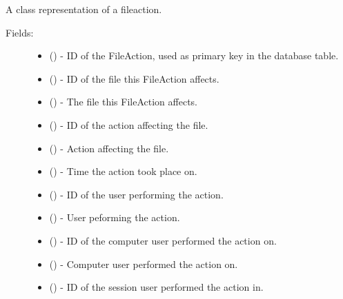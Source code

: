 \documentclass[letterpaper,10pt,english]{sphinxmanual}
\begin{document}
\begin{fulllineitems}
\label{api:models.FileAction}
A class representation of a fileaction.
\begin{description}
\item[{Fields:}] \leavevmode\begin{itemize}
\item {} 
 () - ID of the FileAction, used as primary key in the database table.

\item {} 
 () - ID of the file this FileAction affects.

\item {} 
 () - The file this FileAction affects.

\item {} 
 () - ID of the action affecting the file.

\item {} 
 () - Action affecting the file.

\item {} 
 () - Time the action took place on.

\item {} 
 () - ID of the user performing the action.

\item {} 
 () - User peforming the action.

\item {} 
 () - ID of the computer user performed the action on.

\item {} 
 () - Computer user performed the action on.

\item {} 
 () - ID of the session user performed the action in.


\end{itemize}
\end{description}
\end{fulllineitems}
\end{document}
